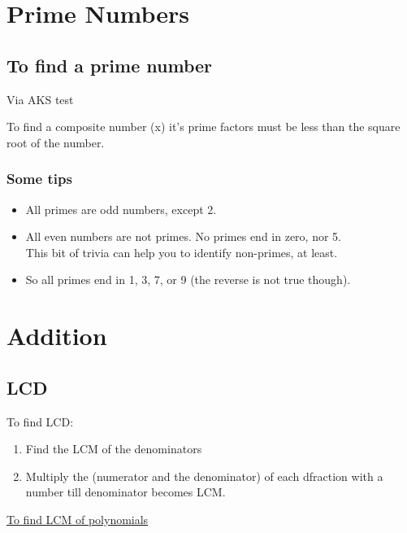 \documentclass[openany]{book}
\begin{document}
\chapter{Prime Numbers}

\section{To find a prime number}

Via AKS test

\begin{theorem}
	To find a composite number (x) it's prime factors must be less than the square root of the number.
\end{theorem}

\subsection{Some tips}

\begin{itemize}

	\item All primes are odd numbers, except 2.
	\item All even numbers are not primes. No primes end in zero, nor 5.\\
	      This bit of trivia can help you to identify non-primes, at least.
	\item So all primes end in 1, 3, 7, or 9 (the reverse is not true though).
	      
\end{itemize}

\chapter{Addition}

\section{LCD}

To find LCD:\@
\begin{enumerate}
	\item Find the LCM of the denominators
	\item Multiply the (numerator and the denominator) of each dfraction with a number till denominator becomes LCM.\@
\end{enumerate}

\href{https://www.youtube.com/watch?v=Ws03IbNrjfM}{To find LCM of polynomials}
\end{document}
